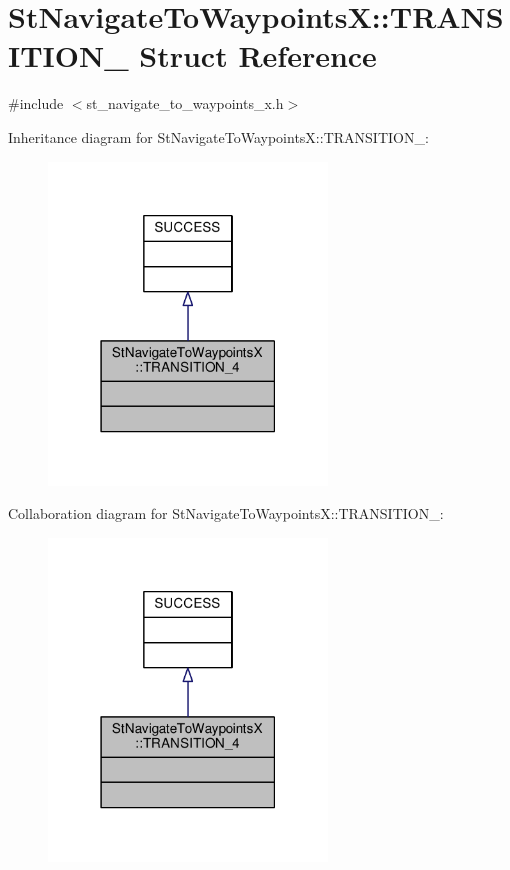 \hypertarget{structStNavigateToWaypointsX_1_1TRANSITION__4}{}\section{St\+Navigate\+To\+WaypointsX\+:\+:T\+R\+A\+N\+S\+I\+T\+I\+O\+N\+\_ Struct Reference}
\label{structStNavigateToWaypointsX_1_1TRANSITION__4}


{\ttfamily \#include $<$st\+\_\+navigate\+\_\+to\+\_\+waypoints\+\_\+x.\+h$>$}



Inheritance diagram for St\+Navigate\+To\+WaypointsX\+:\+:T\+R\+A\+N\+S\+I\+T\+I\+O\+N\+\_\+:
\nopagebreak
\begin{figure}[H]
\begin{center}
\leavevmode
\includegraphics[width=210pt]{structStNavigateToWaypointsX_1_1TRANSITION__4__inherit__graph}
\end{center}
\end{figure}


Collaboration diagram for St\+Navigate\+To\+WaypointsX\+:\+:T\+R\+A\+N\+S\+I\+T\+I\+O\+N\+\_\+:
\nopagebreak
\begin{figure}[H]
\begin{center}
\leavevmode
\includegraphics[width=210pt]{structStNavigateToWaypointsX_1_1TRANSITION__4__coll__graph}
\end{center}
\end{figure}


